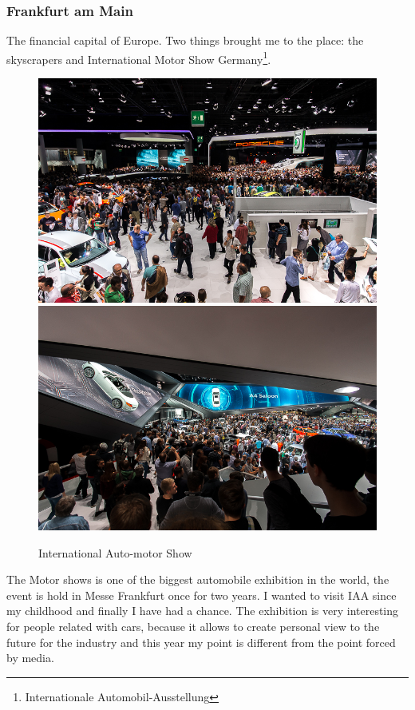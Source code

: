 \documentclass[english]{article}
\begin{document}
\subsubsection{Frankfurt am Main}
The financial capital of Europe. Two things brought me to the place: the skyscrapers and International Motor Show Germany\footnote{Internationale Automobil-Ausstellung }.\\
\begin{figure}
\includegraphics[scale=0.33]{Germany_travel/iaa1}\includegraphics[scale=0.33]{Germany_travel/iaa2}
\caption{International Auto-motor Show}
\end{figure}

The Motor shows is one of the biggest automobile exhibition in the world, the event is hold in Messe Frankfurt once for two years. I wanted to visit IAA since my childhood and finally I have had a chance. The exhibition is very interesting for people related with cars, because it allows to create personal view to the future for the industry and this year my point is different from the point forced by media.\\
\end{document}
